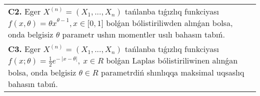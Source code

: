 \documentclass{article}
\begin{document}
\begin{tabular}{m{17cm}}
 \\
\textbf{C2.} 
Eger \(X^{(n)} = \left( X_{1},...,X_{n} \right)\) tańlanba tıǵızlıq funkciyası
${f(x,\theta) = \theta x}^{\theta - 1},x \in \lbrack 0,1\rbrack$
bolǵan bólistiriliwden alınǵan bolsa, onda belgisiz \(\theta\) parametr ushın momentler usılı bahasın tabıń.
 \\
\textbf{C3.} 
Eger \(X^{(n)} = \left( X_{1},...,X_{n} \right)\) tańlanba tıǵızlıq funkciyası
$f(x;\theta) = \frac{1}{2}e^{- \ |x - \theta|},\ x \in R$
bolǵan Laplas bólistiriliwinen alınǵan bolsa, onda belgisiz \(\theta \in R\) parametrdiń shınlıqqa maksimal uqsaslıq bahasın tabıń.
 \\

\end{tabular}
\vspace{1cm}
\end{document}
